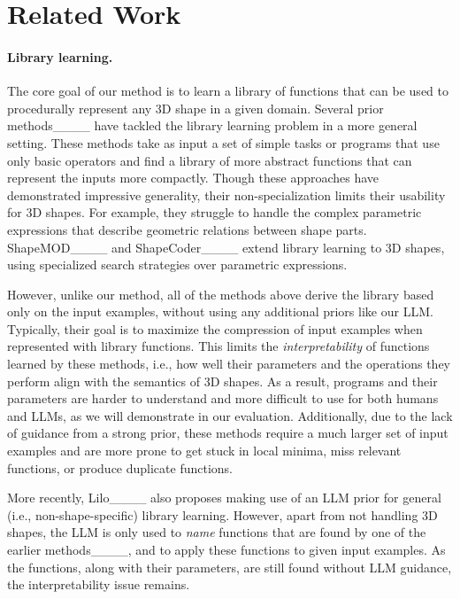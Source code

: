 \section{Related Work}
\paragraph{Library learning.}

The core goal of our method is to learn a library of functions that can be used to procedurally represent any 3D shape in a given domain. Several prior methods____ have tackled the library learning problem in a more general setting. These methods take as input a set of simple tasks or programs that use only basic operators and find a library of more abstract functions that can represent the inputs more compactly.
Though these approaches have demonstrated impressive generality, their non-specialization limits their usability for 3D shapes. 
For example, they struggle to handle the complex parametric expressions that describe geometric relations between shape parts.
ShapeMOD____ and ShapeCoder____ extend library learning to 3D shapes, using specialized search strategies over parametric expressions.

However, unlike our method, all of the methods above derive the library based only on the input examples, without using any additional priors like our LLM. Typically, their goal is to maximize the compression of input examples when represented with library functions. This limits the \emph{interpretability} of functions learned by these methods, i.e., how well their parameters and the operations they perform align with the semantics of 3D shapes. As a result, programs and their parameters are harder to understand and more difficult to use for both humans and LLMs, as we will demonstrate in our evaluation. Additionally, due to the lack of guidance from a strong prior, these methods require a much larger set of input examples and are more prone to get stuck in local minima, miss relevant functions, or produce duplicate functions.

More recently, Lilo____ also proposes making use of an LLM prior for general (i.e., non-shape-specific) library learning. However, apart from not handling 3D shapes, the LLM is only used to \emph{name} functions that are found by one of the earlier methods____, and to apply these functions to given input examples. As the functions, along with their parameters, are still found without LLM guidance, the interpretability issue remains.


